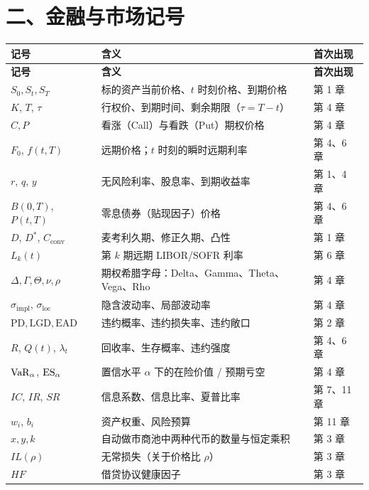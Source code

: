 \section*{二、金融与市场记号}

\vspace{0.3em}
{\tablefont
\begin{longtable}{@{}L{2.9cm}L{8.6cm}L{3.2cm}@{}}
\toprule
\textbf{记号} & \textbf{含义} & \textbf{首次出现} \\
\midrule
\endfirsthead
\toprule
\textbf{记号} & \textbf{含义} & \textbf{首次出现} \\
\midrule
\endhead
\bottomrule
\endlastfoot
$S_0, S_t, S_T$ & 标的资产当前价格、$t$ 时刻价格、到期价格 & 第 1 章 \\
$K$, $T$, $\tau$ & 行权价、到期时间、剩余期限（$\tau = T-t$） & 第 4 章 \\
$C, P$ & 看涨（Call）与看跌（Put）期权价格 & 第 4 章 \\
$F_0$, $f(t,T)$ & 远期价格；$t$ 时刻的瞬时远期利率 & 第 4、6 章 \\
$r$, $q$, $y$ & 无风险利率、股息率、到期收益率 & 第 1、4 章 \\
$B(0,T)$, $P(t,T)$ & 零息债券（贴现因子）价格 & 第 4、6 章 \\
$D$, $D^*$, $C_{\text{conv}}$ & 麦考利久期、修正久期、凸性 & 第 1 章 \\
$L_k(t)$ & 第 $k$ 期远期 LIBOR/SOFR 利率 & 第 6 章 \\
$\Delta,\Gamma,\Theta,\nu,\rho$ & 期权希腊字母：Delta、Gamma、Theta、Vega、Rho & 第 4 章 \\
$\sigma_{\text{impl}}$, $\sigma_{\text{loc}}$ & 隐含波动率、局部波动率 & 第 4 章 \\
$\text{PD},\text{LGD},\text{EAD}$ & 违约概率、违约损失率、违约敞口 & 第 2 章 \\
$R$, $Q(t)$, $\lambda_t$ & 回收率、生存概率、违约强度 & 第 4、6 章 \\
$\operatorname{VaR}_\alpha$, $\operatorname{ES}_\alpha$ & 置信水平 $\alpha$ 下的在险价值 / 预期亏空 & 第 4 章 \\
$IC$, $IR$, $SR$ & 信息系数、信息比率、夏普比率 & 第 7、11 章 \\
$w_i$, $b_i$ & 资产权重、风险预算 & 第 11 章 \\
$x, y, k$ & 自动做市商池中两种代币的数量与恒定乘积 & 第 3 章 \\
$IL(\rho)$ & 无常损失（关于价格比 $\rho$） & 第 3 章 \\
$HF$ & 借贷协议健康因子 & 第 3 章 \\
\end{longtable}
}

